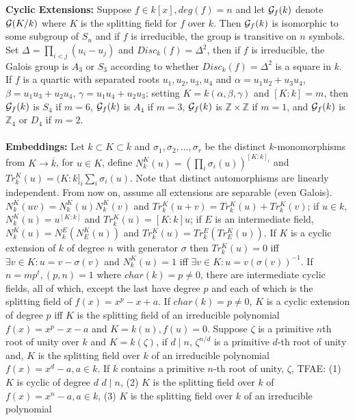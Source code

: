 {\bf Cyclic Extensions:}
Suppose $f \in k[x], deg(f)=n$ and let
${\cal G}_f(k)$ denote 
${\cal G}(K/k)$ where $K$ is the splitting field for $f$ over $k$. Then
${\cal G}_f(k)$ is isomorphic to some subgroup of $S_n$ and if $f$ is irreducible,
the group is transitive on $n$ symbols.  Set $\Delta= \prod_{i<j} (u_i-u_j)$ and
$Disc_k(f)= \Delta^2$, then if $f$ is irreducible, the Galois group is
$A_3$ or $S_3$ according to whether 
$Disc_k(f)= \Delta^2$ is a square in $k$.  If $f$ is a quartic with separated roots
$u_1, u_2, u_3, u_4$ and
$\alpha= u_1 u_2 + u_3 u_4$,
$\beta= u_1 u_3 + u_2 u_4$,
$\gamma= u_1 u_4 + u_2 u_3$; setting $K=k(\alpha, \beta, \gamma)$ and
$[K:k]=m$, then
${\cal G}_f(k)$ is $S_4$ if $m=6$,
${\cal G}_f(k)$ is $A_4$ if $m=3$,
${\cal G}_f(k)$ is ${\mathbb Z} \times {\mathbb Z}$ if $m=1$, and
${\cal G}_f(k)$ is ${\mathbb Z}_4$ 
or $D_4$ if $m=2$.
\\
\\
{\bf Embeddings:}
Let $k \subset K \subset {\overline k}$ and 
$\sigma_1, \sigma_2, \ldots , \sigma_r$ 
be the distinct $k$-monomorphisms from $K \rightarrow {\overline k}$, for
$u \in K$,
define 
$N_k^K(u) = (\prod_{i} \sigma_i(u))^{[K:k]_i}$ and
$Tr_k^K(u) = (K:k]_i \sum_{i} \sigma_i(u)$.  Note that distinct automorphisms are
linearly independent.  From now on, assume all extensions are separable (even Galois).
$N_k^K (uv)= N_k^K(u) N_k^K(v)$ and
$Tr_k^K (u+v)= Tr_k^K(u) + Tr_k^K(v)$; if $u \in k$,
$N_k^K (u)= u^{[K:k]}$ and
$Tr_k^K (u)= [K:k]u$; if $E$ is an intermediate field,
$N_k^K (u)= N_k^E(N_E^K(u))$ and
$Tr_k^K (u)= Tr_k^E(Tr_E^K(u))$.  If $K$ is a cyclic extension of $k$ of degree
$n$ with generator $\sigma$
then $Tr_k^K(u) = 0$ iff $\exists v \in K: u= v - \sigma(v)$ and
$N_k^K(u) = 1$ iff $\exists v \in K: u= v(\sigma(v))^{-1}$.  If $n= mp^t, (p,n)=1$
where $char(k)=p \ne 0$, there are intermediate cyclic fields, all
of which, except the last have degree $p$ and
each of which is the splitting field of $f(x)= x^p-x+a$.
If $char(k)=p \ne 0$, $K$ is a cyclic extension of degree $p$ iff
$K$ is the splitting field of an irreducible polynomial
$f(x)= x^p -x - a$ and $K=k(u), f(u)=0$.
Suppose $\zeta$ is a primitive $n$th root of unity over $k$ and $K= k(\zeta)$,
if $d \mid n$, $\zeta^{n/d}$ is a primitive $d$-th root of unity and,
$K$ is the splitting field over $k$ of an irreducible polynomial
$f(x)= x^d-a, a \in k$.
If $k$ contains a primitive  $n$-th root of unity, $\zeta$,
TFAE: (1) $K$ is cyclic of degree $d$
$d \mid n$,
(2) $K$ is the splitting field over $k$ of $f(x)= x^n-a, a \in k$,
(3) $K$ is the splitting field over $k$ of an irreducible polynomial
